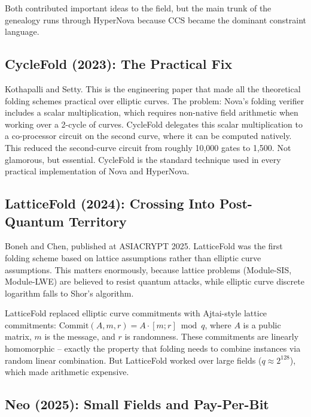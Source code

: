 \documentclass[
  11pt,
  openany]{report}
\begin{document}
Both contributed important ideas to the field, but the main trunk of the
genealogy runs through HyperNova because CCS became the dominant constraint
language.

\subsection{CycleFold (2023): The Practical
Fix}\label{cyclefold-2023-the-practical-fix}

Kothapalli and Setty. This is the engineering paper that made all the
theoretical folding schemes practical over elliptic curves. The problem: Nova's
folding verifier includes a scalar multiplication, which requires non-native
field arithmetic when working over a 2-cycle of curves. CycleFold delegates this
scalar multiplication to a co-processor circuit on the second curve, where it
can be computed natively. This reduced the second-curve circuit from roughly
10,000 gates to 1,500. Not glamorous, but essential. CycleFold is the standard
technique used in every practical implementation of Nova and HyperNova.

\subsection{LatticeFold (2024): Crossing Into Post-Quantum
Territory}\label{latticefold-2024-crossing-into-post-quantum-territory}

Boneh and Chen, published at ASIACRYPT 2025. LatticeFold was the first folding
scheme based on lattice assumptions rather than elliptic curve assumptions. This
matters enormously, because lattice problems (Module-SIS, Module-LWE) are
believed to resist quantum attacks, while elliptic curve discrete logarithm
falls to Shor's algorithm.

LatticeFold replaced elliptic curve commitments with Ajtai-style lattice
commitments: \(\text{Commit}(A, m, r) = A \cdot [m; r] \bmod q\), where \(A\) is
a public matrix, \(m\) is the message, and \(r\) is randomness. These
commitments are linearly homomorphic -- exactly the property that folding needs
to combine instances via random linear combination. But LatticeFold worked over
large fields (\(q \approx 2^{128}\)), which made arithmetic expensive.

\subsection{Neo (2025): Small Fields and
Pay-Per-Bit}\label{neo-2025-small-fields-and-pay-per-bit}
\end{document}
